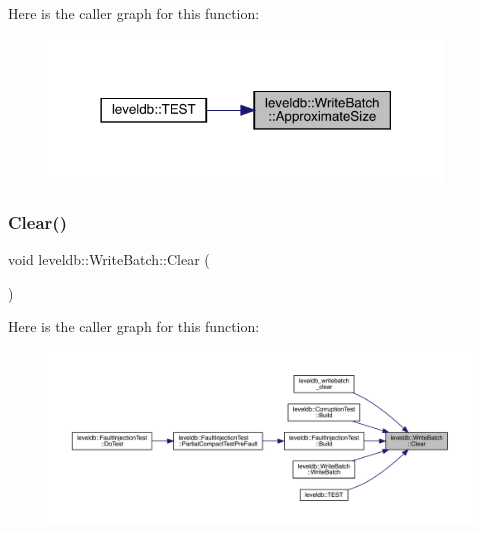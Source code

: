 Here is the caller graph for this function\+:
\nopagebreak
\begin{figure}[H]
\begin{center}
\leavevmode
\includegraphics[width=297pt]{classleveldb_1_1_write_batch_ab6fef29a45e54ede38138dea327b8051_icgraph}
\end{center}
\end{figure}
\mbox{\label{classleveldb_1_1_write_batch_afd5058344dc9be113919a5110129006f}} 
\subsubsection{\texorpdfstring{Clear()}{Clear()}}
{\footnotesize\ttfamily void leveldb\+::\+Write\+Batch\+::\+Clear (\begin{DoxyParamCaption}{ }\end{DoxyParamCaption})}

Here is the caller graph for this function\+:
\nopagebreak
\begin{figure}[H]
\begin{center}
\leavevmode
\includegraphics[width=350pt]{classleveldb_1_1_write_batch_afd5058344dc9be113919a5110129006f_icgraph}
\end{center}
\end{figure}
\mbox{\label{classleveldb_1_1_write_batch_a473da7f94483dab253cc36b7b231ce53}} 
